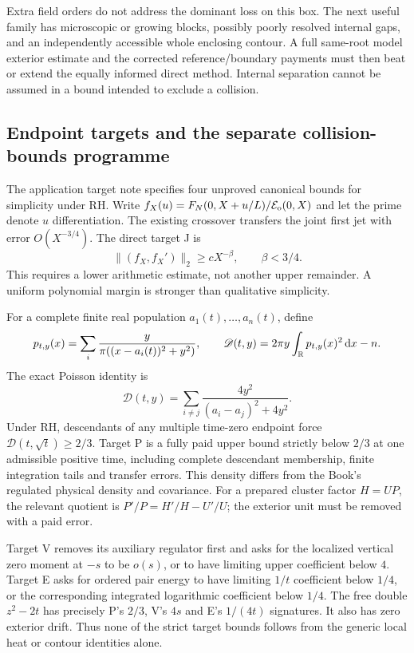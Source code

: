 Extra field orders do not address the dominant loss on this box.
The next useful family has microscopic or growing blocks, possibly
poorly resolved internal gaps, and an independently accessible whole
enclosing contour. A full same-root model exterior estimate and the
corrected reference/boundary payments must then beat or extend the
equally informed direct method. Internal separation cannot be assumed
in a bound intended to exclude a collision.

\subsection{Endpoint targets and the separate collision-bounds programme}
The application target note \cite{simplicity-targets} specifies four
unproved canonical bounds for simplicity under RH. Write
$f_X(u)=F_N(0,X+u/L)/\mathcal E_{\mathrm o}(0,X)$ and let the prime denote $u$
differentiation. The existing crossover transfers the joint first jet
with error $O(X^{-3/4})$. The direct target J is
\[
 \|(f_X,f_X')\|_2\ge cX^{-\beta},\qquad \beta<3/4.
\]
This requires a lower arithmetic estimate, not another upper remainder.
A uniform polynomial margin is stronger than qualitative simplicity.

For a complete finite real population $a_1(t),\ldots,a_n(t)$, define
\[
 p_{t,y}(x)=\sum_i\frac{y}{\pi((x-a_i(t))^2+y^2)},\qquad
 \mathscr D(t,y)=2\pi y\int_{\mathbb R}p_{t,y}(x)^2\,\mathrm d x-n.
\]
The exact Poisson identity is
\[
 \mathscr D(t,y)=\sum_{i\ne j}\frac{4y^2}{(a_i-a_j)^2+4y^2}.
\]
Under RH, descendants of any multiple time-zero endpoint force
$\mathscr D(t,\sqrt t)\ge2/3$. Target P is a fully paid upper bound
strictly below $2/3$ at one admissible positive time, including complete
descendant membership, finite integration tails and transfer errors.
This density differs from the Book's regulated physical density and
covariance. For a prepared cluster factor $H=UP$, the relevant quotient
is $P'/P=H'/H-U'/U$; the exterior unit must be removed with a paid error.

Target V removes its auxiliary regulator first and asks for the
localized vertical zero moment at $-s$ to be $o(s)$, or to have limiting
upper coefficient below $4$. Target E asks for ordered pair energy
to have limiting $1/t$ coefficient below $1/4$, or the corresponding
integrated logarithmic coefficient below $1/4$. The free double
$z^2-2t$ has precisely P's $2/3$, V's $4s$ and E's $1/(4t)$ signatures.
It also has zero exterior drift. Thus none of the strict target bounds
follows from the generic local heat or contour identities alone.

